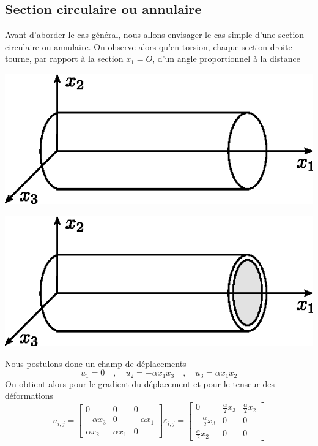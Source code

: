 \subsection{Section circulaire ou annulaire}
Avant d'aborder le cas général, nous allons envisager le cas simple d'une section circulaire ou annulaire.
On ohserve alors qu'en torsion, chaque section droite tourne, par rapport à la section $x_1=O$, d'un angle proportionnel à la distance
\begin{multicols}{2}
    \begin{center}
        \includegraphics{../images/T1_Ch07-09}
    \end{center}
    \begin{center}
        \includegraphics{../images/T1_Ch07-10}
    \end{center}
\end{multicols}
Nous postulons donc un champ de déplacements
\begin{equation}
    u_1 = 0 \quad,\quad u_2 = -\alpha x_1 x_3 \quad,\quad u_3 = \alpha x_1 x_2
    \label{eq:Ch07-037}
\end{equation}
On obtient alors pour le gradient du déplacement et pour le tenseur des déformations
\begin{equation}
    u_{i,j} = 
    \begin{bmatrix}
        0 & 0 & 0 \\
        -\alpha x_3 & 0 & -\alpha x_1 \\
        \alpha x_2 & \alpha x_1 & 0
    \end{bmatrix}
    \varepsilon_{i,j} = 
    \begin{bmatrix}
        0 & \frac{\alpha}{2}x_3 & \frac{\alpha}{2}x_2 \\
        -\frac{\alpha}{2}x_3 & 0 & 0 \\
        \frac{\alpha}{2}x_2 & 0 & 0
    \end{bmatrix}
    \label{eq:Ch07-038}
\end{equation}
